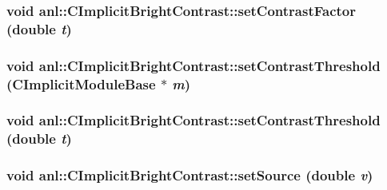 \label{classanl_1_1CImplicitBrightContrast_a556e2ce291391f68988c9ceb1dbf977e}
\hypertarget{classanl_1_1CImplicitBrightContrast_a91df65732ee76a344ea5bfccb4e3733a}{
\subsubsection[{setContrastFactor}]{\setlength{\rightskip}{0pt plus 5cm}void anl::CImplicitBrightContrast::setContrastFactor (double {\em t})}}
\label{classanl_1_1CImplicitBrightContrast_a91df65732ee76a344ea5bfccb4e3733a}
\hypertarget{classanl_1_1CImplicitBrightContrast_a47379f5975f848fa306309be7abb15f9}{
\subsubsection[{setContrastThreshold}]{\setlength{\rightskip}{0pt plus 5cm}void anl::CImplicitBrightContrast::setContrastThreshold ({\bf CImplicitModuleBase} $\ast$ {\em m})}}
\label{classanl_1_1CImplicitBrightContrast_a47379f5975f848fa306309be7abb15f9}
\hypertarget{classanl_1_1CImplicitBrightContrast_a7d6a2ed8330e8974f965a29dc9f7170f}{
\subsubsection[{setContrastThreshold}]{\setlength{\rightskip}{0pt plus 5cm}void anl::CImplicitBrightContrast::setContrastThreshold (double {\em t})}}
\label{classanl_1_1CImplicitBrightContrast_a7d6a2ed8330e8974f965a29dc9f7170f}
\hypertarget{classanl_1_1CImplicitBrightContrast_aaa62e32b549b7cdb28a167b6b46b0221}{
\subsubsection[{setSource}]{\setlength{\rightskip}{0pt plus 5cm}void anl::CImplicitBrightContrast::setSource (double {\em v})}}
